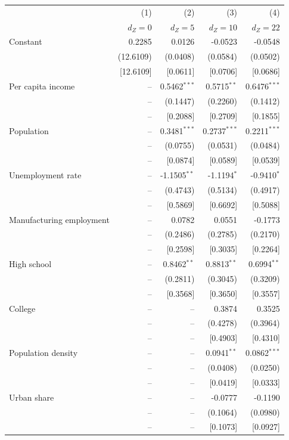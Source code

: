 \begin{tabular}{lrrrr}
\toprule
& (1) & (2) & (3) & (4) \\
& $d_Z = 0$ & $d_Z = 5$ & $d_Z = 10$ & $d_Z = 22$ \\
\midrule
Constant & 0.2285 & 0.0126 & -0.0523 & -0.0548 \\
 & (12.6109) & (0.0408) & (0.0584) & (0.0502) \\
 & [12.6109] & [0.0611] & [0.0706] & [0.0686] \\
Per capita income & -- & 0.5462$^{***}$ & 0.5715$^{**}$ & 0.6476$^{***}$ \\
 & -- & (0.1447) & (0.2260) & (0.1412) \\
 & -- & [0.2088] & [0.2709] & [0.1855] \\
Population & -- & 0.3481$^{***}$ & 0.2737$^{***}$ & 0.2211$^{***}$ \\
 & -- & (0.0755) & (0.0531) & (0.0484) \\
 & -- & [0.0874] & [0.0589] & [0.0539] \\
Unemployment rate & -- & -1.1505$^{**}$ & -1.1194$^{*}$ & -0.9410$^{*}$ \\
 & -- & (0.4743) & (0.5134) & (0.4917) \\
 & -- & [0.5869] & [0.6692] & [0.5088] \\
Manufacturing employment & -- & 0.0782 & 0.0551 & -0.1773 \\
 & -- & (0.2486) & (0.2785) & (0.2170) \\
 & -- & [0.2598] & [0.3035] & [0.2264] \\
High school & -- & 0.8462$^{**}$ & 0.8813$^{**}$ & 0.6994$^{**}$ \\
 & -- & (0.2811) & (0.3045) & (0.3209) \\
 & -- & [0.3568] & [0.3650] & [0.3557] \\
College & -- & -- & 0.3874 & 0.3525 \\
 & -- & -- & (0.4278) & (0.3964) \\
 & -- & -- & [0.4903] & [0.4310] \\
Population density & -- & -- & 0.0941$^{**}$ & 0.0862$^{***}$ \\
 & -- & -- & (0.0408) & (0.0250) \\
 & -- & -- & [0.0419] & [0.0333] \\
Urban share & -- & -- & -0.0777 & -0.1190 \\
 & -- & -- & (0.1064) & (0.0980) \\
 & -- & -- & [0.1073] & [0.0927] \\

\end{tabular}
